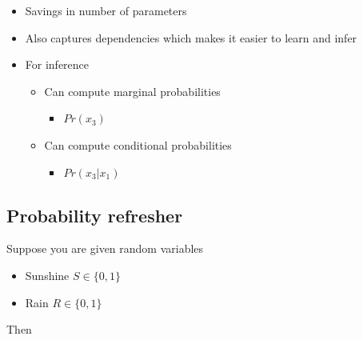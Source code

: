 \documentclass[12pt]{article}
\begin{document}
\begin{itemize}
	\item Savings in number of parameters
	\item Also captures dependencies which makes it easier to learn and infer
	\item For inference
		\begin{itemize}
			\item Can compute marginal probabilities
				\begin{itemize}
					\item $Pr(x_3)$
				\end{itemize}
			\item Can compute conditional probabilities
				\begin{itemize}
					\item $Pr(x_3 | x_1)$
				\end{itemize}
		\end{itemize}
\end{itemize}

\subsection{Probability refresher}

Suppose you are given random variables

\begin{itemize}
	\item Sunshine $S \in \{ 0, 1 \}$
	\item Rain $R \in \{ 0, 1 \}$
\end{itemize}

Then
\end{document}
